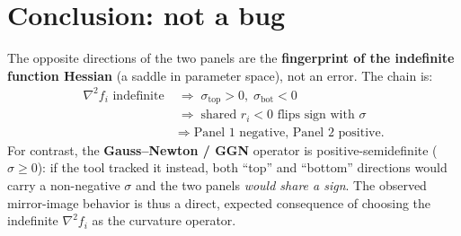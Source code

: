 \documentclass[11pt]{article}
\newcommand{\sgtop}{\sigma_{\mathrm{top}}}
\newcommand{\sgbot}{\sigma_{\mathrm{bot}}}
\begin{document}
\section{Conclusion: not a bug}

The opposite directions of the two panels are the \textbf{fingerprint of the indefinite function
Hessian} (a saddle in parameter space), not an error. The chain is:
\begin{equation*}
  \begin{aligned}
  \nabla^2 f_i \text{ indefinite}
    &\;\Rightarrow\; \sgtop>0,\;\sgbot<0 \\
    &\;\Rightarrow\; \text{shared } r_i<0 \text{ flips sign with } \sigma \\
    &\;\Rightarrow\; \text{Panel 1 negative, Panel 2 positive.}
  \end{aligned}
\end{equation*}
For contrast, the \textbf{Gauss--Newton / GGN} operator is positive-semidefinite ($\sigma\ge0$):
if the tool tracked it instead, both ``top'' and ``bottom'' directions would carry a non-negative
$\sigma$ and the two panels \emph{would share a sign}. The observed mirror-image behavior is thus a
direct, expected consequence of choosing the indefinite $\nabla^2 f_i$ as the curvature operator.
\end{document}
